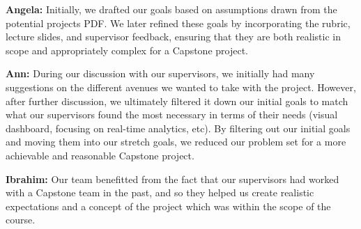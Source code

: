 \documentclass{article}
\begin{document}
\begin{enumerate}
\textbf{Angela:} Initially, we drafted our goals based on assumptions drawn from the potential projects PDF. We later refined these goals by incorporating the rubric, lecture slides, and supervisor feedback, ensuring that they are both realistic in scope and appropriately complex for a Capstone project.

\textbf{Ann:} During our discussion with our supervisors, we initially had many suggestions on the different avenues we wanted to take with the project. However, after further discussion, we ultimately filtered it down our initial goals to match what our supervisors found the most necessary in terms of their needs (visual dashboard, focusing on real-time analytics, etc). By filtering out our initial goals and moving them into our stretch goals, we reduced our problem set for a more achievable and reasonable Capstone project. 

\textbf{Ibrahim:} Our team benefitted from the fact that our supervisors had worked with a Capstone team in the past, and so they helped us create realistic expectations and a concept of the project which was within the scope of the course.

\end{enumerate}  
\end{document}
